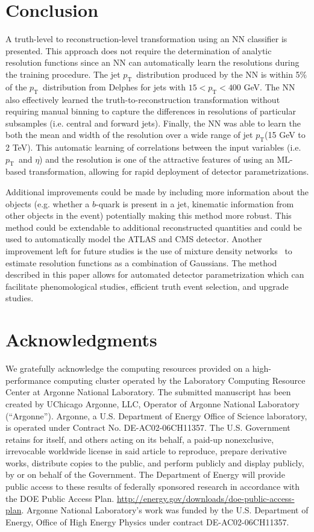 \documentclass[showpacs,showkeys,preprint,prd,nofootinbib,linenumbers,12pt,superscriptaddress]{revtex4-1}
\def\pt{\ensuremath{p_{\mathrm{T}}}}
\begin{document}
\section{Conclusion}
A truth-level to reconstruction-level transformation using an NN classifier is presented. This approach does not require the determination of analytic resolution functions since an NN can automatically learn the resolutions during the training procedure. The jet \pt\ distribution produced by the NN is within 5\% of the \pt\ distribution from Delphes for jets with $15 < \pt < 400$ GeV. The NN also effectively learned the truth-to-reconstruction transformation without requiring manual binning to capture the differences in resolutions of particular subsamples (i.e. central and forward jets). Finally, the NN was able to learn the both the mean and width of the resolution over a wide range of jet \pt (15 GeV to 2 TeV). This automatic learning of correlations between the input variables (i.e. \pt\ and $\eta$) and the resolution is one of the attractive features of using an ML-based transformation, allowing for rapid deployment of detector parametrizations.

Additional improvements could be made by including more information about the objects (e.g. whether a $b$-quark is present in a jet, kinematic information from other objects in the event) potentially making this method more robust. This method could be extendable to additional reconstructed quantities and could be used to automatically model the ATLAS and CMS detector. Another improvement left for future studies is the use of mixture density networks~\cite{Bishop94mixturedensity} to estimate resolution functions as a combination of Gaussians. The method described in this paper allows for automated detector parametrization which can facilitate phenomological studies, efficient truth event selection, and upgrade studies.

\section*{Acknowledgments}
We gratefully acknowledge the computing resources provided on a
high-performance computing cluster operated by the
Laboratory Computing Resource Center at Argonne National Laboratory.
The submitted manuscript has been created by UChicago Argonne, LLC,
Operator of Argonne National Laboratory (“Argonne”). Argonne, a U.S.
Department of Energy Office of Science laboratory, is operated under
Contract No. DE-AC02-06CH11357. The U.S. Government retains for itself,
and others acting on its behalf, a paid-up nonexclusive, irrevocable
worldwide license in said article to reproduce, prepare derivative works,
distribute copies to the public, and perform publicly and display
publicly, by or on behalf of the Government.
The Department of Energy will provide public access to these results of
federally sponsored research in accordance with the
DOE Public Access Plan.
\url{http://energy.gov/downloads/doe-public-access-plan}. Argonne
National Laboratory’s work was
funded by the U.S. Department of Energy, Office of High Energy Physics
under contract DE-AC02-06CH11357.


\end{document}
